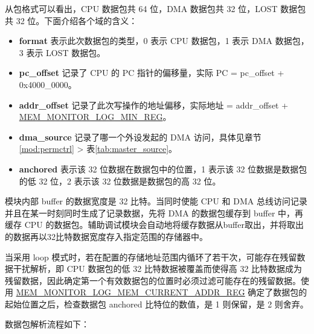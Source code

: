 \documentclass[main\_\_CN.tex]{subfiles}
\begin{document}
从包格式可以看出，CPU 数据包共 64 位，DMA 数据包共 32 位，LOST 数据包共 32 位。下面介绍各个域的含义：
\begin{itemize}
    \item {\bfseries format} 表示此次数据包的类型，0 表示 CPU 数据包，1 表示 DMA 数据包，3 表示 LOST 数据包。
    \item {\bfseries pc\_offset} 记录了 CPU 的 PC 指针的偏移量，实际 PC = pc\_offset + 0x4000\_0000。
    \item {\bfseries addr\_offset} 记录了此次写操作的地址偏移，实际地址 = addr\_offset + \hyperref[regdesc:MEMMONITORLOGMINREG]{MEM\_MONITOR\_LOG\_MIN\_REG}。
    \item {\bfseries dma\_source} 记录了哪一个外设发起的 DMA 访问，具体见章节 \ref{mod:permctrl} \textit{} > 表\ref{tab:master_source}。
    \item {\bfseries anchored} 表示该 32 位数据在数据包中的位置，1 表示该 32 位数据是数据包的低 32 位，2 表示该 32 位数据是数据包的高 32 位。
    
\end{itemize}

模块内部 buffer 的数据宽度是 32 比特。当同时使能 CPU 和 DMA 总线访问记录并且在某一时刻同时生成了记录数据，先将 DMA 的数据包缓存到 buffer 中，再缓存 CPU 的数据包。辅助调试模块会自动地将缓存数据从buffer取出，并将取出的数据再以32比特数据宽度存入指定范围的存储器中。

当采用 loop 模式时，若在配置的存储地址范围内循环了若干次，可能存在残留数据干扰解析，即 CPU 数据包的低 32 比特数据被覆盖而使得高 32 比特数据成为残留数据，因此确定第一个有效数据包的位置时必须过滤可能存在的残留数据。使用 \hyperref[regdesc:MEMMONITORLOGMEMCURRENTADDRREG]{MEM\_MONITOR\_LOG\_MEM\_CURRENT\_ADDR\_REG} 确定了数据包的起始位置之后，检查数据包 anchored 比特位的数值，是 1 则保留，是 2 则舍弃。

数据包解析流程如下：
\end{document}
